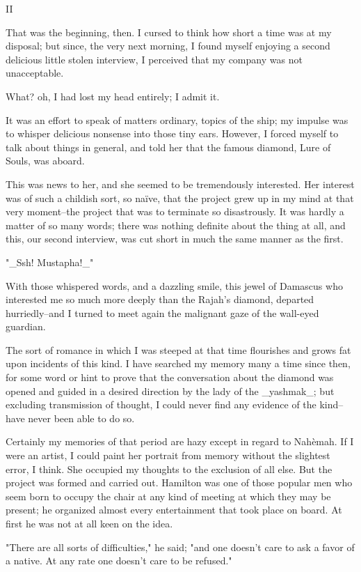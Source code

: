 II

That was the beginning, then. I cursed to think how short a time was
at my disposal; but since, the very next morning, I found myself
enjoying a second delicious little stolen interview, I perceived that
my company was not unacceptable.

What? oh, I had lost my head entirely; I admit it.

It was an effort to speak of matters ordinary, topics of the ship; my
impulse was to whisper delicious nonsense into those tiny ears.
However, I forced myself to talk about things in general, and told her
that the famous diamond, Lure of Souls, was aboard.

This was news to her, and she seemed to be tremendously interested.
Her interest was of such a childish sort, so naïve, that the project
grew up in my mind at that very moment--the project that was to
terminate so disastrously. It was hardly a matter of so many words;
there was nothing definite about the thing at all, and this, our
second interview, was cut short in much the same manner as the first.

"_Ssh! Mustapha!_"

With those whispered words, and a dazzling smile, this jewel of
Damascus who interested me so much more deeply than the Rajah's
diamond, departed hurriedly--and I turned to meet again the malignant
gaze of the wall-eyed guardian.

The sort of romance in which I was steeped at that time flourishes and
grows fat upon incidents of this kind. I have searched my memory many
a time since then, for some word or hint to prove that the
conversation about the diamond was opened and guided in a desired
direction by the lady of the _yashmak_; but excluding transmission of
thought, I could never find any evidence of the kind--have never been
able to do so.

Certainly my memories of that period are hazy except in regard to
Nahèmah. If I were an artist, I could paint her portrait from memory
without the slightest error, I think. She occupied my thoughts to the
exclusion of all else. But the project was formed and carried out.
Hamilton was one of those popular men who seem born to occupy the
chair at any kind of meeting at which they may be present; he
organized almost every entertainment that took place on board. At
first he was not at all keen on the idea.

"There are all sorts of difficulties," he said; "and one doesn't care
to ask a favor of a native. At any rate one doesn't care to be
refused."

